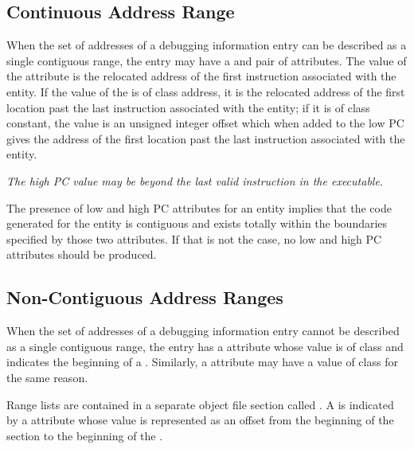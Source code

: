 \subsection{Continuous Address Range}
\label{chap:contiguousaddressranges}
When the set of addresses of a debugging information entry can
be described as a single contiguous range, the entry 
may 
have
a \DWATlowpc{} and 
\DWAThighpc{} pair of attributes. 
The value
of the 
\DWATlowpc{} attribute 
is the relocated address of the
first instruction associated with the entity. If the value of
the \DWAThighpc{} is of class address, it is the relocated
address of the first location past the last instruction
associated with the entity; if it is of class constant, the
value is an unsigned integer offset which when added to the
low PC gives the address of the first location past the last
instruction associated with the entity.

\textit{The high PC value
may be beyond the last valid instruction in the executable.}

The presence of low and high PC attributes for an entity
implies that the code generated for the entity is contiguous
and exists totally within the boundaries specified by those
two attributes. If that is not the case, no low and high PC
attributes should be produced.

\subsection{Non-Contiguous Address Ranges}
\label{chap:noncontiguousaddressranges}
When the set of addresses of a debugging information entry
cannot be described as a single contiguous range, the entry has
a \DWATranges{} attribute 
whose value is of class 
and indicates the beginning of a .
Similarly,
a \DWATstartscope{} attribute 
may have a value of class
 for the same reason.  

Range lists are contained in a separate object file section called 
\dotdebugranges{}. A
 is indicated by a 
\DWATranges{} attribute whose
value is represented as an offset from the beginning of the
\dotdebugranges{} section to the beginning of the 
.

